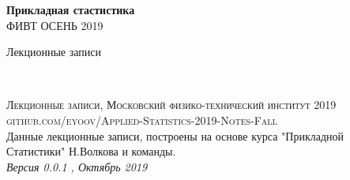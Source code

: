 \documentclass[11pt,fleqn]{book} %
\begin{document}

\begingroup
\thispagestyle{empty}
\centering
\vspace*{5cm}
\par\normalfont\fontsize{35}{35}\sffamily\selectfont
\textbf{Прикладная стастистика}\\
{\LARGE  ФИВТ ОСЕНЬ 2019}\par %
\vspace*{1cm}
{\Huge Лекционные записи}\par %
\endgroup


\newpage
~\vfill
\thispagestyle{empty}


\noindent \textsc{Лекционные записи, Московский физико-технический институт 2019}\\

\noindent \textsc{github.com/eyoov/Applied-Statistics-2019-Notes-Fall}\\ %

\noindent Данные лекционные записи, построены на основе курса "Прикладной Статистики" Н.Волкова и команды.  \\ %

\noindent \textit{Версия 0.0.1 , Октябрь 2019} %



\pagestyle{empty} %

\tableofcontents %

\end{document}
